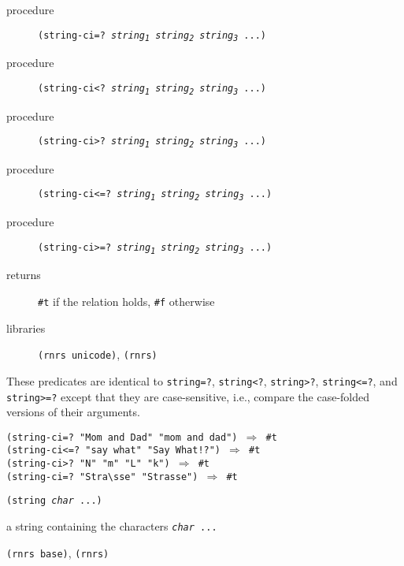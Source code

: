 \begin{description}

\label{objects_s216}\item[procedure] \texttt{(string-ci=? \textit{string\textsubscript{1}} \textit{string\textsubscript{2}} \textit{string\textsubscript{3}} ...)}



\item[procedure] \texttt{(string-ci\textless{}? \textit{string\textsubscript{1}} \textit{string\textsubscript{2}} \textit{string\textsubscript{3}} ...)}



\item[procedure] \texttt{(string-ci\textgreater{}? \textit{string\textsubscript{1}} \textit{string\textsubscript{2}} \textit{string\textsubscript{3}} ...)}



\item[procedure] \texttt{(string-ci\textless{}=? \textit{string\textsubscript{1}} \textit{string\textsubscript{2}} \textit{string\textsubscript{3}} ...)}



\item[procedure] \texttt{(string-ci\textgreater{}=? \textit{string\textsubscript{1}} \textit{string\textsubscript{2}} \textit{string\textsubscript{3}} ...)}



\item[returns] \texttt{\#{}t} if the relation holds, \texttt{\#{}f} otherwise


\item[libraries] \texttt{(rnrs unicode)}, \texttt{(rnrs)}
\end{description}


These predicates are identical to
\texttt{string=?}, \texttt{string\textless{}?}, \texttt{string\textgreater{}?}, \texttt{string\textless{}=?}, and
\texttt{string\textgreater{}=?} except that they are case-sensitive,
i.e., compare the case-folded versions of their arguments.


\begin{alltt}
(string-ci=? "Mom and Dad" "mom and dad") \(\Rightarrow\) \#{}t
(string-ci\textless{}=? "say what" "Say What!?") \(\Rightarrow\) \#{}t
(string-ci\textgreater{}? "N" "m" "L" "k") \(\Rightarrow\) \#{}t
(string-ci=? "Stra\textbackslash{}sse" "Strasse") \(\Rightarrow\) \#{}t
\end{alltt}

\begin{description}

\label{objects_s217}\item[procedure] \texttt{(string \textit{char} ...)}



\item[returns] a string containing the characters \texttt{\textit{char} ...}


\item[libraries] \texttt{(rnrs base)}, \texttt{(rnrs)}
\end{description}


